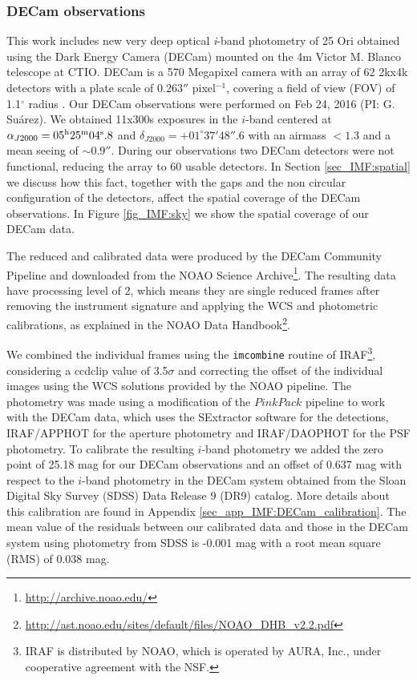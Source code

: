 \documentclass[12pt]{article}
\begin{document}
\subsubsection{DECam observations}
\label{sec_IMF:DECam}

This work includes new very deep optical \textit{i}-band photometry of 25 Ori obtained using the Dark Energy Camera (\ac{DECam}) mounted on the 4m Victor M. Blanco telescope at CTIO. DECam is a 570 Megapixel camera with an array of 62 2kx4k detectors with a plate scale of $0.263''$ pixel$^{-1}$, covering a field of view (\ac{FOV}) of 1.1$^\circ$ radius \citep{Flaugher2015}. Our DECam observations were performed on Feb 24, 2016 (PI: G. Su\'arez). We obtained 11x300s exposures in the $i$-band centered at $\alpha_{J2000}= 05^{\rm h} 25^{\rm m} 04^{\rm s}.8$ and $\delta_{J2000} = +01^{\circ} 37' 48''.6$ with an airmass $<1.3$ and a mean seeing of $\sim 0.9''$. During our observations two DECam detectors were not functional, reducing the array to 60 usable detectors. In Section \ref{sec_IMF:spatial} we discuss how this fact, together with the gaps and the non circular configuration of the detectors, affect the spatial coverage of the DECam observations. In Figure \ref{fig_IMF:sky} we show the spatial coverage of our DECam data.

The reduced and calibrated data were produced by the DECam Community Pipeline \citep{Valdes2014} and downloaded from the NOAO Science Archive\footnote{\url{http://archive.noao.edu/}}. The resulting data have processing level of 2, which means they are single reduced frames after removing the instrument signature and applying the WCS and photometric calibrations, as explained in the NOAO Data Handbook\footnote{\url{http://ast.noao.edu/sites/default/files/NOAO\_DHB\_v2.2.pdf}}.

We combined the individual frames using the \texttt{imcombine} routine of IRAF\footnote{IRAF is distributed by NOAO, which is operated by AURA, Inc., under cooperative agreement with the NSF.}, considering a ccdclip value of 3.5$\sigma$ and correcting the offset of the individual images using the WCS solutions provided by the NOAO pipeline. The photometry was made using a modification of the $PinkPack$ pipeline \citep{Levine2006} to work with the DECam data, which uses the SExtractor software \citep{Bertin-Arnouts1996} for the detections, IRAF/APPHOT for the aperture photometry and IRAF/DAOPHOT for the PSF photometry. To calibrate the resulting $i$-band photometry we added the zero point of 25.18 mag for our DECam observations and an offset of 0.637 mag with respect to the $i$-band photometry in the DECam system obtained from the Sloan Digital Sky Survey (\ac{SDSS}) Data Release 9 (DR9) \citep{Ahn2012} catalog. More details about this calibration are found in Appendix \ref{sec_app_IMF:DECam_calibration}. The mean value of the residuals between our calibrated data and those in the DECam system using photometry from SDSS is -0.001 mag with a root mean square (\ac{RMS}) of 0.038 mag.
\end{document}
